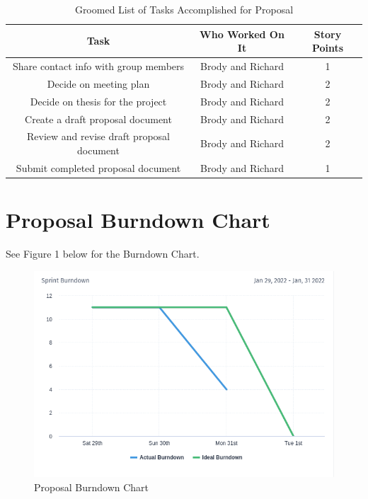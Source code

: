 \documentclass[conference]{IEEEtran}
\begin{document}
\begin{table}
\caption{Groomed List of Tasks Accomplished for Proposal}
\begin{tabular}{|c|c|c|}
\hline
\textbf{Task} & \textbf{Who Worked On It} & \textbf{Story Points} \\ \hline \hline
Share contact info with group members & Brody and Richard & 1 \\ \hline
Decide on meeting plan & Brody and Richard & 2 \\ \hline
Decide on thesis for the project & Brody and Richard & 2 \\ \hline
Create a draft proposal document & Brody and Richard & 2 \\ \hline
Review and revise draft proposal document & Brody and Richard & 2 \\ \hline
Submit completed proposal document & Brody and Richard & 1 \\ \hline
\hline
\end{tabular}
\end{table}

\section{Proposal Burndown Chart}
See Figure 1 below for the Burndown Chart.

\begin{figure}
\begin{center}
\includegraphics[scale=0.75]{2022-01-29_to_2022-01-31.png}
\caption{Proposal Burndown Chart}
\end{center}
\end{figure}



\end{document}
